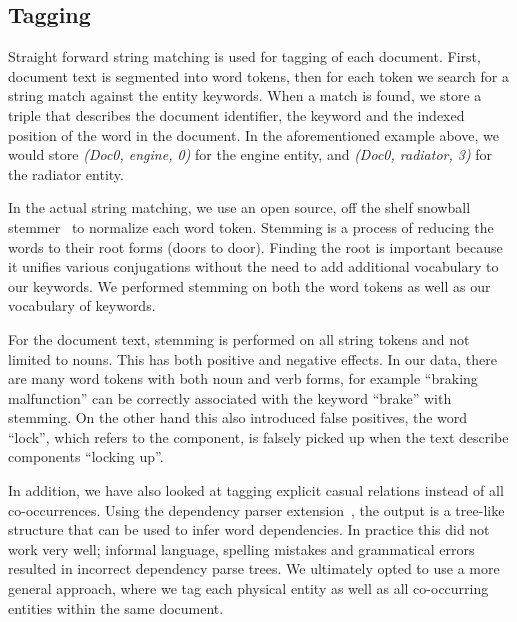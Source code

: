 \subsection{Tagging}
Straight forward string matching is used for tagging of each document.
First, document text is segmented into word tokens, then for each token we
search for a string match against the entity keywords. When a match is found, we
store a triple that describes the document identifier, the keyword and the
indexed position of the word in the document. In the aforementioned example
above, we would store
\emph{(Doc0, engine, 0)} for the engine entity, and \emph{(Doc0, radiator, 3)}
for the radiator entity.


In the actual string matching, we use an open source, off the shelf snowball
stemmer~\cite{snowball} to normalize each word token. 
Stemming is a process of reducing the words to their root forms (\eg doors to door). Finding the
root is important because it unifies various conjugations without the need to
add additional vocabulary to our keywords. We performed stemming on both the
word tokens as well as our vocabulary of keywords.

For the document text, stemming is performed on all string tokens and not
limited to nouns. This has both positive and negative effects. In our data, 
there are many word tokens with both noun and verb forms, for example ``braking
malfunction'' can be correctly associated with the keyword ``brake'' with
stemming. On the other hand this also introduced false positives, the word
``lock'', which refers to the component, is falsely picked up when the text describe components
``locking up''.

In addition, we have also looked at tagging explicit casual relations instead of 
all co-occurrences. Using the dependency parser extension~\cite{Marneffe2006}, 
the output is a tree-like structure that can be used to infer
word dependencies. In practice this did not work very well; informal language,
spelling mistakes and grammatical errors resulted in incorrect dependency parse
trees. We ultimately opted to use a more general approach, where we tag each
physical entity as well as all co-occurring entities within the same document.


